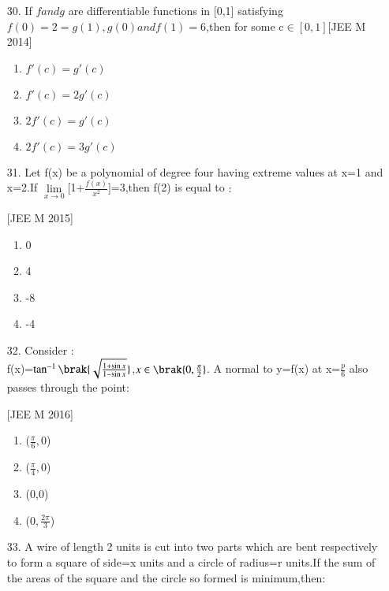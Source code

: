 \documentclass[journal,12pt,twocolumn]{IEEEtran}
\theoremstyle{remark}
\begin{document}
\begin{enumerate}
\begin{enumerate}
\end{enumerate}

\item[30.] If $f and g$ are differentiable functions in {[0,1]} satisfying $f(0)=2=g(1),g(0) and f(1)=6$,then for some c$\in {[0,1]}$\hfill[JEE M 2014]
\begin{enumerate}
    \item  $f'(c)=g'(c)$\\
    \item  $f'(c)=2g'(c)$\\
    \item  $2f'(c)=g'(c)$\\
    \item  $2f'(c)=3g'(c)$\\
\end{enumerate}
\item[31.] Let f(x) be a polynomial of degree four having extreme values at x=1 and x=2.If $\lim\limits_{x\to 0}$[1+$\frac{f(x)}{x^{2}}$]=3,then f(2) is equal to $:$

    \hfill[JEE M 2015]\\
\begin{enumerate}
    \item  0\\
    \item  4\\
    \item -8\\
    \item -4\\
\end{enumerate}    
\item[32.] Consider $:$\\
     f(x)=$\tan^{-1}\brak{ \sqrt{\frac{1+\sin{x}}{1-\sin{x}} }}$,$x \in \brak{0,\frac{\pi}{2}}$.
A normal to y=f(x) at x=$\frac{p}{6}$ also passes through the point$:$

\hfill[JEE M 2016]\\
\begin{enumerate}
    \item  ($\frac{\pi}{6},0$)\\
    \item  ($\frac{\pi}{4},0$)\\
    \item  (0,0)\\
    \item  ($0,\frac{2\pi}{3}$)\\
\end{enumerate}
\item[33.] A wire of length 2 units is cut into two parts which are bent respectively to form a square of side=x units and a circle of radius=r units.If the sum of the areas of the square and the circle so formed is minimum,then$:$


\end{enumerate}
\end{document}

